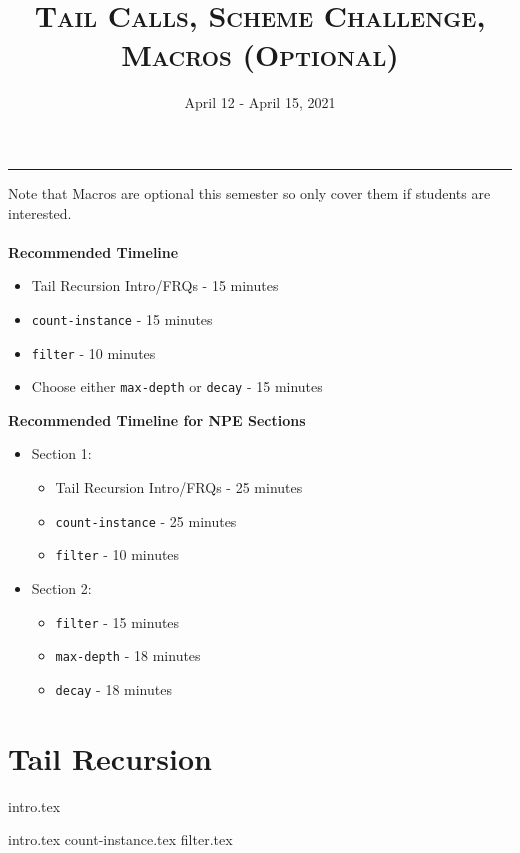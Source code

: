 \documentclass{exam}
\title{\textsc{Tail Calls, Scheme Challenge, Macros (Optional)}}
\date{April 12 - April 15, 2021}
\begin{document}
\maketitle
\rule{\textwidth}{0.15em}
\fontsize{12}{15}\selectfont

\begin{guide}
\begin{blocksection}
    Note that Macros are optional this semester so only cover them if students are interested.
    \\ \\
    \textbf{Recommended Timeline}
    \begin{itemize}
        \item Tail Recursion Intro/FRQs - 15 minutes
        \item \lstinline{count-instance} - 15 minutes
        \item \lstinline{filter} - 10 minutes
        \item Choose either \lstinline{max-depth} or \lstinline{decay} - 15 minutes
    \end{itemize}
    \vspace{.5cm}
    \textbf{Recommended Timeline for NPE Sections}
    \begin{itemize}
        \item Section 1:
            \begin{itemize}
                \item Tail Recursion Intro/FRQs - 25 minutes
                \item \lstinline{count-instance} - 25 minutes
                \item \lstinline{filter} - 10 minutes
            \end{itemize}
        \item Section 2:
            \begin{itemize}
                \item \lstinline{filter} - 15 minutes
                \item \lstinline{max-depth} - 18 minutes
                \item \lstinline{decay} - 18 minutes
            \end{itemize}
    \end{itemize}
\end{blocksection}
\newpage
\end{guide}

\section{Tail Recursion}
{intro.tex}
\begin{questions}
{intro.tex}
{count-instance.tex}
{filter.tex}
\end{questions}
\end{document}
